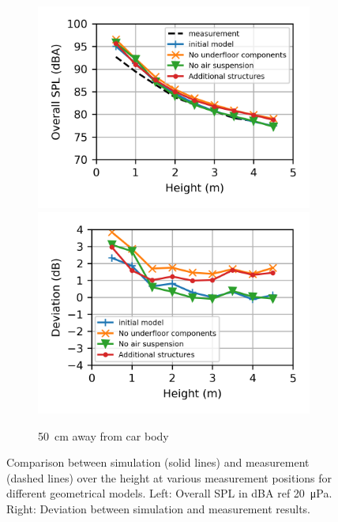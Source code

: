 \begin{figure}
\begin{subfigure}[b]{\textwidth}
		\includegraphics{fig/chap5/geometry_variation/overall_SPL/pos_f.png}
		\hfill
		\includegraphics{fig/chap5/geometry_variation/overall_SPL/pos_f_deviation.png}
		\caption{\SI{50}{\centi\meter} away from car body}
	\end{subfigure}
	\caption{Comparison between simulation (solid lines) and measurement (dashed lines) over the height at various measurement positions for different geometrical models. Left: Overall SPL in dBA ref \SI{20}{\micro\pascal}. Right: Deviation between simulation and measurement results.}
	\label{fig:overall_SPL_geometry}
\end{figure}

